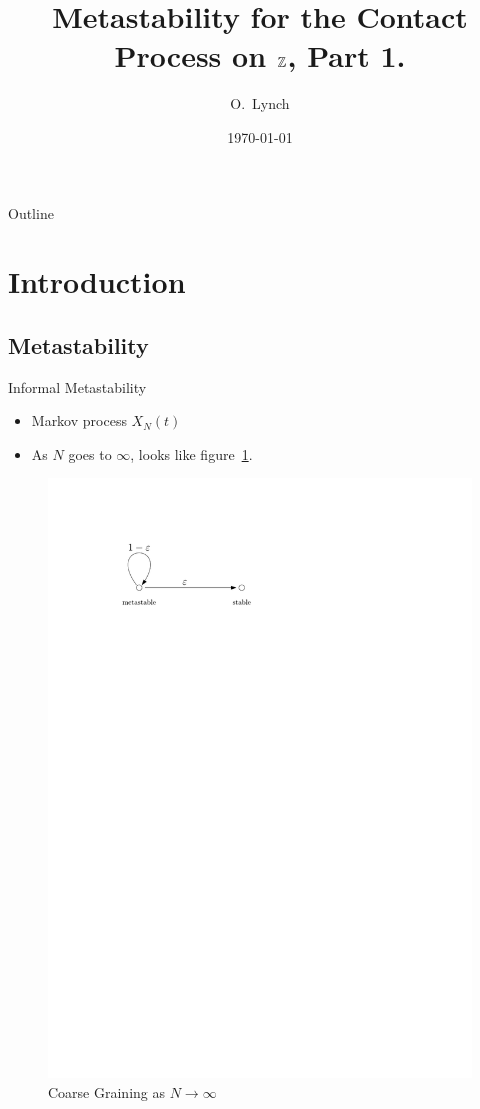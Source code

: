 \documentclass{beamer}
\title{Metastability for the Contact Process on $\mathbb{Z}$, Part 1.}
\author{O.~Lynch\inst{1}}
\institute[Universiteit Utrecht]
{
  \inst{1}%
  Department of Mathematics \\
  Universiteit Utrecht
}
\date{\today}
\begin{document}
\begin{frame}
  \titlepage
\end{frame}

\begin{frame}{Outline}
  \tableofcontents
\end{frame}

\section{Introduction}

\subsection{Metastability}

\begin{frame}{Informal Metastability}
  \begin{itemize}
    \item Markov process $X_{N}(t)$
    \pause
    \item As $N$ goes to $\infty$, looks like figure~\ref{fig:coarse_grain}.
  \end{itemize}
  \begin{figure}
    \includegraphics[width=0.7\pagewidth]{metastable_coarse_grain.pdf}
    \caption{Coarse Graining as $N \to \infty$}
    \label{fig:coarse_grain}
  \end{figure}
\end{frame}
\end{document}

